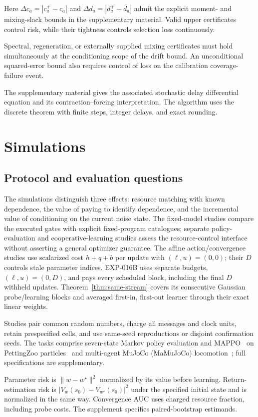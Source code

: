 \documentclass[journal]{IEEEtran}
\begin{document}
Here $\Delta c_a=|c_a^+-c_a|$ and $\Delta d_a=|d_a^+-d_a|$ admit the explicit moment- and mixing-slack bounds in the supplementary material.
Valid upper certificates control risk, while their tightness controls selection loss continuously.

Spectral, regeneration, or externally supplied mixing certificates must hold simultaneously at the conditioning scope of the drift bound.
An unconditional squared-error bound also requires control of loss on the calibration coverage-failure event.

The supplementary material gives the associated stochastic delay differential equation and its contraction--forcing interpretation.
The algorithm uses the discrete theorem with finite steps, integer delays, and exact rounding.

\section{Simulations}
\subsection{Protocol and evaluation questions}
The simulations distinguish three effects: resource matching with known dependence, the value of paying to identify dependence, and the incremental value of conditioning on the current noise state.
The fixed-model studies compare the executed gates with explicit fixed-program catalogues; separate policy-evaluation and cooperative-learning studies assess the resource-control interface without asserting a general optimizer guarantee.
The affine action/convergence studies use scalarized cost $h+q+b$ per update with $(\ell,u)=(0,0)$; their $D$ controls stale parameter indices.
EXP-016B uses separate budgets, $(\ell,u)=(0,D)$, and pays every scheduled block, including the final $D$ withheld updates.
Theorem~\ref{thm:same-stream} covers its consecutive Gaussian probe/learning blocks and averaged first-in, first-out learner through their exact linear weights.

Studies pair common random numbers, charge all messages and clock units, retain prespecified cells, and use same-seed reproductions or disjoint confirmation seeds.
The tasks comprise seven-state Markov policy evaluation and MAPPO~\cite{yu2022mappo} on PettingZoo particles~\cite{terry2021pettingzoo} and multi-agent MuJoCo (MaMuJoCo) locomotion~\cite{peng2021facmac}; full specifications are supplementary.

Parameter risk is $\|w-w^\star\|^2$ normalized by its value before learning.
Return-estimation risk is $|V_w(s_0)-V_{w^\star}(s_0)|^2$ under the specified initial state and is normalized in the same way.
Convergence AUC uses charged resource fraction, including probe costs.
The supplement specifies paired-bootstrap estimands.
\end{document}
